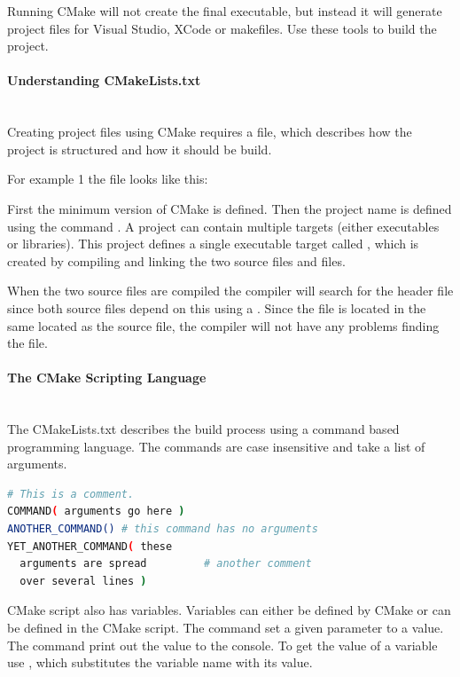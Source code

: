 \documentclass[11pt,a4paper,landscape]{scrartcl} %
\newcommand{\sectiontitle}[1]{\paragraph{#1} \ \\} %
\begin{document}
\begin{multicols}{2}
Running CMake will not create the final executable, but instead it will generate project files for Visual Studio, XCode or makefiles. Use these tools to build the project.

\sectiontitle{Understanding CMakeLists.txt}

Creating project files using CMake requires a  file, which describes how the project is structured and how it should be build.

For example 1 the file looks like this: 



First the minimum version of CMake is defined. Then the project name is defined using the command . A project can contain multiple targets (either executables or libraries). This project defines a single executable target called , which is created by compiling and linking the two source files  and  files.

When the two source files are compiled the compiler will search for the header file  since both source files depend on this using a . Since the file is located in the same located as the source file, the compiler will not have any problems finding the file.
			
\sectiontitle{The CMake Scripting Language}

The CMakeLists.txt describes the build process using a command based programming language. The commands are case insensitive and take a list of arguments.

\begin{lstlisting}[language=bash]
# This is a comment.
COMMAND( arguments go here )
ANOTHER_COMMAND() # this command has no arguments
YET_ANOTHER_COMMAND( these
  arguments are spread         # another comment 
  over several lines )
\end{lstlisting}

CMake script also has variables. Variables can either be defined by CMake or can be defined in the CMake script.  The command  set a given parameter to a value. The command  print out the value to the console. To get the value of a variable use , which substitutes the variable name with its value.




\end{multicols}
\end{document}
